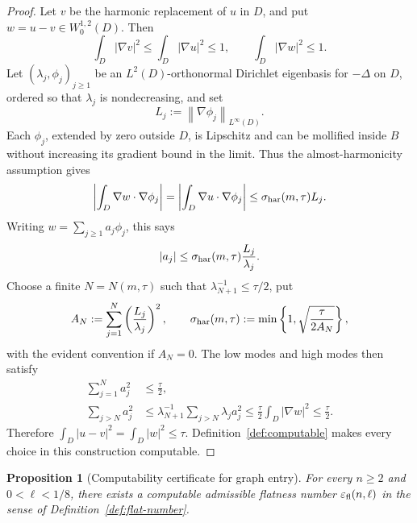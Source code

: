 \documentclass[11pt]{amsart}
\newtheorem{proposition}[theorem]{Proposition}
\theoremstyle{definition}
\newcommand{\norm}[1]{\left\|#1\right\|}
\begin{document}
\begin{proof}
Let \(v\) be the harmonic replacement of \(u\) in \(D\), and put
\(w=u-v\in W^{1,2}_0(D)\).  Then
\[
   \int_D|\nabla v|^2\le\int_D|\nabla u|^2\le1,\qquad
   \int_D|\nabla w|^2\le1.
\]
Let \((\lambda_j,\phi_j)_{j\ge1}\) be an \(L^2(D)\)-orthonormal
Dirichlet eigenbasis for \(-\Delta\) on \(D\), ordered so that
\(\lambda_j\) is nondecreasing, and set
\[
   L_j:=\norm{\nabla\phi_j}_{L^\infty(D)}.
\]
Each \(\phi_j\), extended by zero outside \(D\), is Lipschitz and can
be mollified inside \(B\) without increasing its gradient bound in
the limit.  Thus the almost-harmonicity assumption gives
\[
   \left|\int_D\nabla w\cdot\nabla\phi_j\right|
      =\left|\int_D\nabla u\cdot\nabla\phi_j\right|
      \le\sigma_{\rm har}(m,\tau)L_j.
\]
Writing \(w=\sum_{j\ge1}a_j\phi_j\), this says
\[
   |a_j|\le \sigma_{\rm har}(m,\tau)\frac{L_j}{\lambda_j}.
\]
Choose a finite \(N=N(m,\tau)\) such that
\(\lambda_{N+1}^{-1}\le\tau/2\), put
\[
   A_N:=\sum_{j=1}^{N}\left(\frac{L_j}{\lambda_j}\right)^2,
   \qquad
   \sigma_{\rm har}(m,\tau)
      :=\min\left\{1,\sqrt{\frac{\tau}{2A_N}}\right\},
\]
with the evident convention if \(A_N=0\).  The low modes and high
modes then satisfy
\[
\begin{aligned}
   \sum_{j=1}^{N}a_j^2&\le\frac{\tau}{2},\\
   \sum_{j>N}a_j^2
      &\le\lambda_{N+1}^{-1}
          \sum_{j>N}\lambda_j a_j^2
       \le\frac{\tau}{2}\int_D|\nabla w|^2
       \le\frac{\tau}{2}.
\end{aligned}
\]
Therefore \(\int_D|u-v|^2=\int_D|w|^2\le\tau\).
Definition~\ref{def:computable} makes every choice in this construction
computable.
\end{proof}

\begin{proposition}[Computability certificate for graph entry]
\label{prop:flat-number-computable}
For every \(n\ge2\) and \(0<\ell<1/8\), there exists a computable
admissible flatness number \(\varepsilon_{\rm fl}(n,\ell)\) in the
sense of Definition~\ref{def:flat-number}.
\end{proposition}
\end{document}
